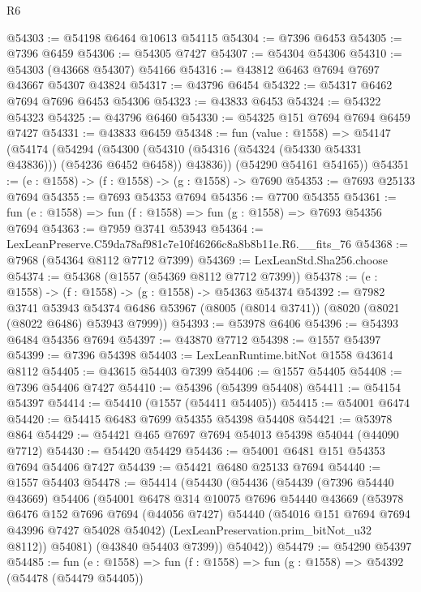 \begin{lexlean}{R6}
\begin{coremodule}
@54303 := @54198 @6464 @10613 @54115
@54304 := @7396 @6453
@54305 := @7396 @6459
@54306 := @54305 @7427
@54307 := @54304 @54306
@54310 := @54303 (@43668 @54307) @54166
@54316 := @43812 @6463 @7694 @7697 @43667 @54307 @43824
@54317 := @43796 @6454
@54322 := @54317 @6462 @7694 @7696 @6453 @54306
@54323 := @43833 @6453
@54324 := @54322 @54323
@54325 := @43796 @6460
@54330 := @54325 @151 @7694 @7694 @6459 @7427
@54331 := @43833 @6459
@54348 := fun (value : @1558) =>
  @54147
    (@54174
      (@54294
        (@54300 (@54310 (@54316 (@54324 (@54330 @54331 @43836))) (@54236 @6452 @6458)) @43836))
      (@54290 @54161 @54165))
@54351 := (e : @1558) -> (f : @1558) -> (g : @1558) -> @7690
@54353 := @7693 @25133 @7694
@54355 := @7693 @54353 @7694
@54356 := @7700 @54355
@54361 := fun (e : @1558) => fun (f : @1558) => fun (g : @1558) => @7693 @54356 @7694
@54363 := @7959 @3741 @53943
@54364 := LexLeanPreserve.C59da78af981c7e10f46266c8a8b8b11e.R6.__fits_76
@54368 := @7968 (@54364 @8112 @7712 @7399)
@54369 := LexLeanStd.Sha256.choose
@54374 := @54368 (@1557 (@54369 @8112 @7712 @7399))
@54378 := (e : @1558) -> (f : @1558) -> (g : @1558) -> @54363 @54374
@54392 := @7982
    @3741
    @53943
    @54374
    @6486
    @53967
    (@8005 (@8014 @3741))
    (@8020 (@8021 (@8022 @6486) @53943 @7999))
@54393 := @53978 @6406
@54396 := @54393 @6484 @54356 @7694
@54397 := @43870 @7712
@54398 := @1557 @54397
@54399 := @7396 @54398
@54403 := LexLeanRuntime.bitNot @1558 @43614 @8112
@54405 := @43615 @54403 @7399
@54406 := @1557 @54405
@54408 := @7396 @54406 @7427
@54410 := @54396 (@54399 @54408)
@54411 := @54154 @54397
@54414 := @54410 (@1557 (@54411 @54405))
@54415 := @54001 @6474
@54420 := @54415 @6483 @7699 @54355 @54398 @54408
@54421 := @53978 @864
@54429 := @54421 @465 @7697 @7694 @54013 @54398 @54044 (@44090 @7712)
@54430 := @54420 @54429
@54436 := @54001 @6481 @151 @54353 @7694 @54406 @7427
@54439 := @54421 @6480 @25133 @7694
@54440 := @1557 @54403
@54478 := @54414
    (@54430
      (@54436
        (@54439
          (@7396 @54440 @43669)
          @54406
          (@54001
            @6478
            @314
            @10075
            @7696
            @54440
            @43669
            (@53978
              @6476
              @152
              @7696
              @7694
              (@44056 @7427)
              @54440
              (@54016 @151 @7694 @7694 @43996 @7427 @54028 @54042)
              (LexLeanPreservation.prim_bitNot_u32 @8112))
            @54081)
          (@43840 @54403 @7399))
        @54042))
@54479 := @54290 @54397
@54485 := fun (e : @1558) => fun (f : @1558) => fun (g : @1558) => @54392 (@54478 (@54479 @54405))

\end{coremodule}
\end{lexlean}

